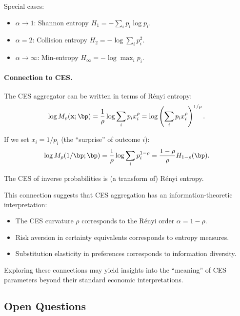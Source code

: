 Special cases:
\begin{itemize}[nosep]
\item $\alpha \to 1$: Shannon entropy $H_1 = -\sum_i p_i \log p_i$.
\item $\alpha = 2$: Collision entropy $H_2 = -\log \sum_i p_i^2$.
\item $\alpha \to \infty$: Min-entropy $H_\infty = -\log \max_i p_i$.
\end{itemize}

\paragraph{Connection to CES.}
The CES aggregator can be written in terms of Rényi entropy:
\begin{equation}
\log M_\rho(\bx; \bp) = \frac{1}{\rho} \log \sum_i p_i x_i^\rho = \log \left( \sum_i p_i x_i^\rho \right)^{1/\rho}.
\label{eq:ac-adv-ces-renyi}
\end{equation}

If we set $x_i = 1/p_i$ (the ``surprise'' of outcome $i$):
\begin{equation}
\log M_\rho(1/\bp; \bp) = \frac{1}{\rho} \log \sum_i p_i^{1-\rho} = \frac{1-\rho}{\rho} H_{1-\rho}(\bp).
\label{eq:ac-adv-ces-entropy}
\end{equation}

The CES of inverse probabilities is (a transform of) Rényi entropy.

\begin{calloutnote}
This connection suggests that CES aggregation has an information-theoretic interpretation:
\begin{itemize}[nosep]
\item The CES curvature $\rho$ corresponds to the Rényi order $\alpha = 1 - \rho$.
\item Risk aversion in certainty equivalents corresponds to entropy measures.
\item Substitution elasticity in preferences corresponds to information diversity.
\end{itemize}

Exploring these connections may yield insights into the ``meaning'' of CES parameters beyond their standard economic interpretations.
\end{calloutnote}

\subsection{Open Questions}
\label{subsec:ac-adv-open}

